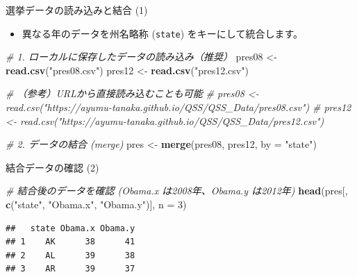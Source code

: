\documentclass[
  ignorenonframetext,
]{beamer}
\newenvironment{Shaded}{\begin{snugshade}}{\end{snugshade}}
\newcommand{\AttributeTok}[1]{\textcolor[rgb]{0.13,0.29,0.53}{#1}}
\newcommand{\CommentTok}[1]{\textcolor[rgb]{0.56,0.35,0.01}{\textit{#1}}}
\newcommand{\DecValTok}[1]{\textcolor[rgb]{0.00,0.00,0.81}{#1}}
\newcommand{\FunctionTok}[1]{\textcolor[rgb]{0.13,0.29,0.53}{\textbf{#1}}}
\newcommand{\NormalTok}[1]{#1}
\newcommand{\OtherTok}[1]{\textcolor[rgb]{0.56,0.35,0.01}{#1}}
\newcommand{\StringTok}[1]{\textcolor[rgb]{0.31,0.60,0.02}{#1}}
\providecommand{\tightlist}{%
  \setlength{\itemsep}{0pt}\setlength{\parskip}{0pt}}
\begin{document}
\begin{frame}[fragile]{選挙データの読み込みと結合 (1)}
\label{ux9078ux6319ux30c7ux30fcux30bfux306eux8aadux307fux8fbcux307fux3068ux7d50ux5408-1}
\begin{itemize}
\tightlist
\item
  異なる年のデータを州名略称 (\texttt{state}) をキーにして統合します。
\end{itemize}

\scriptsize

\begin{Shaded}
\begin{Highlighting}[]
\CommentTok{\# 1. ローカルに保存したデータの読み込み（推奨）}
\NormalTok{pres08 }\OtherTok{\textless{}{-}} \FunctionTok{read.csv}\NormalTok{(}\StringTok{"pres08.csv"}\NormalTok{)}
\NormalTok{pres12 }\OtherTok{\textless{}{-}} \FunctionTok{read.csv}\NormalTok{(}\StringTok{"pres12.csv"}\NormalTok{)}

\CommentTok{\# （参考）URLから直接読み込むことも可能}
\CommentTok{\# pres08 \textless{}{-} read.csv("https://ayumu{-}tanaka.github.io/QSS/QSS\_Data/pres08.csv")}
\CommentTok{\# pres12 \textless{}{-} read.csv("https://ayumu{-}tanaka.github.io/QSS/QSS\_Data/pres12.csv")}

\CommentTok{\# 2. データの結合 (merge)}
\NormalTok{pres }\OtherTok{\textless{}{-}} \FunctionTok{merge}\NormalTok{(pres08, pres12, }\AttributeTok{by =} \StringTok{"state"}\NormalTok{)}
\end{Highlighting}
\end{Shaded}

\normalsize
\end{frame}

\begin{frame}[fragile]{結合データの確認 (2)}
\label{ux7d50ux5408ux30c7ux30fcux30bfux306eux78baux8a8d-2}
\scriptsize

\begin{Shaded}
\begin{Highlighting}[]
\CommentTok{\# 結合後のデータを確認 (Obama.x は2008年、Obama.y は2012年)}
\FunctionTok{head}\NormalTok{(pres[, }\FunctionTok{c}\NormalTok{(}\StringTok{"state"}\NormalTok{, }\StringTok{"Obama.x"}\NormalTok{, }\StringTok{"Obama.y"}\NormalTok{)], }\AttributeTok{n =} \DecValTok{3}\NormalTok{)}
\end{Highlighting}
\end{Shaded}

\begin{verbatim}
##   state Obama.x Obama.y
## 1    AK      38      41
## 2    AL      39      38
## 3    AR      39      37
\end{verbatim}

\normalsize
\end{frame}
\end{document}
